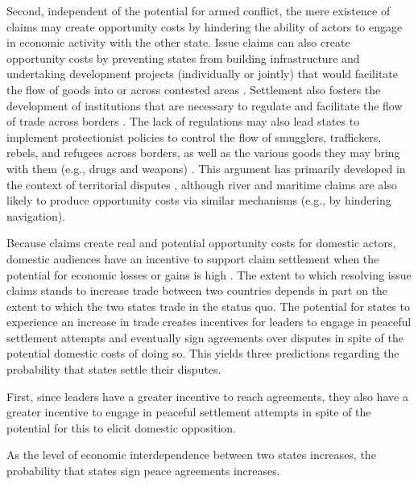 Second, independent of the potential for armed conflict, the mere existence of claims may create opportunity costs by hindering the ability of actors to engage in economic activity with the other state. 
Issue claims can also create opportunity costs by preventing states from building infrastructure and undertaking development projects (individually or jointly) that would facilitate the flow of goods into or across contested areas \citep{carter2018, gavrilis2008, simmons2005, toset2000}. Settlement also fosters the development of institutions that are necessary to regulate and facilitate the flow of trade across borders \citep{carter2010, carter2014, simmons2005}. The lack of regulations may also lead states to implement protectionist policies to control the flow of smugglers, traffickers, rebels, and refugees across borders, as well as the various goods they may bring with them (e.g., drugs and weapons) \citep[e.g.,][]{carter2017, gavrilis2008, simmons2005}. This argument has primarily developed in the context of territorial disputes \citep[e.g., ][]{carter2018, schultz2015, simmons1999, simmons2002, simmons2005, simmons2006a}, although river and maritime claims are also likely to produce opportunity costs via similar mechanisms (e.g., by hindering navigation). 




Because claims create real and potential opportunity costs for domestic actors, domestic audiences have an incentive to support claim settlement when the potential for economic losses or gains is high \citep{lee2012, schultz2015}. The extent to which resolving issue claims stands to increase trade between two countries depends in part on the extent to which the two states trade in the status quo. The potential for states to experience an increase in trade creates incentives for leaders to engage in peaceful settlement attempts and eventually sign agreements over disputes in spite of the potential domestic costs of doing so. This yields three predictions regarding the probability that states settle their disputes. 

First, since leaders have a greater incentive to reach agreements, they also have a greater incentive to engage in peaceful settlement attempts in spite of the potential for this to elicit domestic opposition.

\begin{hypothesis} As the level of economic interdependence between two states increases, the probability that states sign peace agreements increases. \label{hyp: agreements} \end{hypothesis}


